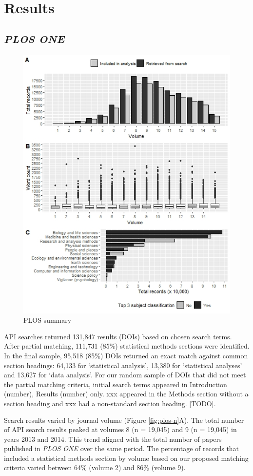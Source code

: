 \documentclass[12pt]{article}
\begin{document}
\hypertarget{results}{%
\section{Results}\label{results}}

\hypertarget{plos-one}{%
\subsection{\texorpdfstring{\emph{PLOS ONE}}{PLOS ONE}}\label{plos-one}}

\begin{figure}

{\centering \includegraphics[width=0.6\linewidth]{figures/plos.summary} 

}

\caption{\label{fig:plos-n}PLOS summary}\label{fig:unnamed-chunk-3}
\end{figure}

API searches returned 131,847 results (DOIs) based on chosen search
terms. After partial matching, 111,731 (85\%) statistical methods
sections were identified. In the final sample, 95,518 (85\%) DOIs
returned an exact match against common section headings: 64,133 for
`statistical analysis', 13,380 for `statistical analyses' and 13,627 for
`data analysis'. For our random sample of DOIs that did not meet the
partial matching criteria, initial search terms appeared in Introduction
(number), Results (number) only. xxx appeared in the Methods section
without a section heading and xxx had a non-standard section heading.
{[}TODO{]}.

Search results varied by journal volume (Figure \ref{fig:plos-n}A). The
total number of API search results peaked at volumes 8 (n = 19,045) and
9 (n = 19,045) in years 2013 and 2014. This trend aligned with the total
number of papers published in \emph{PLOS ONE} over the same period. The
percentage of records that included a statistical methods section by
volume based on our proposed matching criteria varied between 64\%
(volume 2) and 86\% (volume 9).
\end{document}
